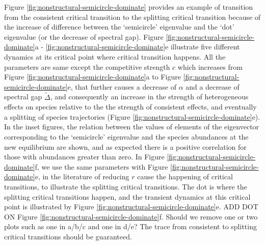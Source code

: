 \documentclass[a4paper,fleqn,12pt]{article}
\begin{document}
Figure \ref{fig:nonstructural-semicircle-dominate} provides an example of transition from the consistent critical transition to the splitting critical transition because of the increase of difference between the `semicircle' eigenvalue and the `dot' eigenvalue (or the decrease of spectral gap).
Figure \ref{fig:nonstructural-semicircle-dominate}a - \ref{fig:nonstructural-semicircle-dominate}e illustrate five different dynamics at its critical point where critical transition happens.
All the parameters are same except the competitive strength $c$ which increases from Figure \ref{fig:nonstructural-semicircle-dominate}a to Figure \ref{fig:nonstructural-semicircle-dominate}e,
that further causes a decrease of $\alpha$ and a decrease of spectral gap $\widetilde{\Delta}$,
and consequently an increase in the strength of heterogeneous effects on species relative to the the strength of consistent effects,
and eventually a splitting of species trajectories (Figure \ref{fig:nonstructural-semicircle-dominate}e). 
In the inset figures, the relation between the values of elements of the eigenvector corresponding to the `semicircle' eigenvalue and the species abundances at the new equilibrium are shown, and as expected there is a positive correlation for those with abundances greater than zero.
In Figure \ref{fig:nonstructural-semicircle-dominate}f,
we use the same parameters with Figure \ref{fig:nonstructural-semicircle-dominate}e,
in the literature of reducing $r$ cause the happening of critical transitions,
to illustrate the splitting critical transitions.
The dot is where the splitting critical transitions happen,
and the transient dynamics at this critical point is illustrated by Figure \ref{fig:nonstructural-semicircle-dominate}e.
{\color{red}ADD DOT ON Figure \ref{fig:nonstructural-semicircle-dominate}f.
Should we remove one or two plots such as one in a/b/c and one in d/e?
The trace from consistent to splitting critical transitions should be guaranteed.}
\end{document}
